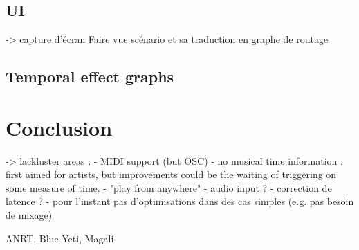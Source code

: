 \documentclass{article}
\begin{document}
\subsection{UI}
-> capture d'écran
Faire vue scénario et sa traduction en graphe de routage 

\subsection{Temporal effect graphs}
\section{Conclusion}
-> lackluster areas : 
- MIDI support (but OSC)
- no musical time information : first aimed for artists, 
but improvements could be the waiting of triggering on some measure of time.
- "play from anywhere"
- audio input ?
- correction de latence ?
- pour l'instant pas d'optimisations dans des cas simples (e.g. pas besoin de mixage)
\begin{acknowledgments}
    ANRT, Blue Yeti, Magali
\end{acknowledgments} 


\end{document}
